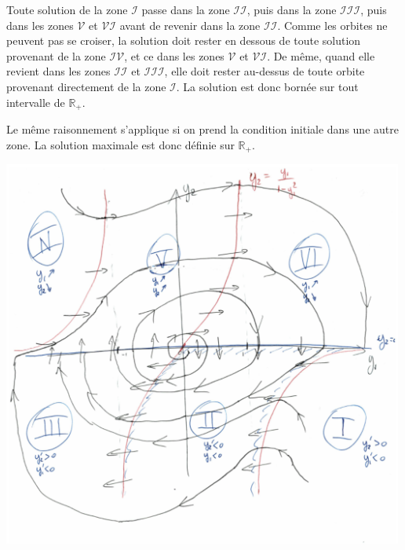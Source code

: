 \documentclass[11pt,a4paper]{article}
\newcommand{\R}{\mathbb R}
\begin{document}
\begin{enumerate}
  
  Toute solution de la zone $\mathcal{I}$ passe dans la zone $\mathcal{II}$,
  puis dans la zone $\mathcal{III}$, puis dans les zones $\mathcal{V}$ et $\mathcal{VI}$
  avant de revenir dans la zone $\mathcal{II}$.
  Comme les orbites ne peuvent pas se croiser, la solution doit rester en dessous
  de toute solution provenant de la zone $\mathcal{IV}$, et ce dans les zones $\mathcal{V}$
  et $\mathcal{VI}$.
  De m\^eme, quand elle revient dans les zones $\mathcal{II}$ et $\mathcal{III}$,
  elle doit rester au-dessus de toute orbite provenant directement de la zone $\mathcal{I}$.
  La solution est donc born\'ee sur tout intervalle de $\R_+$.

  Le m\^eme raisonnement s'applique si on prend la condition initiale dans une autre zone.
  La solution maximale est donc d\'efinie sur $\R_+$.

\end{enumerate}

\includegraphics[width=0.99\textwidth]{portrait_phases.pdf}

\newpage
\end{document}
